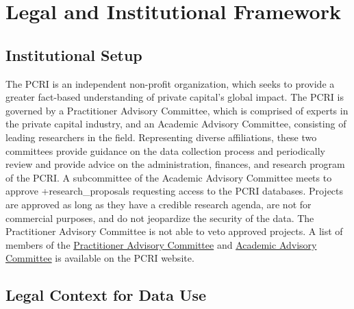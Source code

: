 \documentclass[
]{book}
\begin{document}
\hypertarget{legal-and-institutional-framework-3}{%
\section{Legal and Institutional Framework}\label{legal-and-institutional-framework-3}}

\hypertarget{institutional-setup-3}{%
\subsection{Institutional Setup}\label{institutional-setup-3}}

The PCRI is an independent non-profit organization, which seeks to provide a greater fact-based understanding of private capital's global impact. The PCRI is governed by a Practitioner Advisory Committee, which is comprised of experts in the private capital industry, and an Academic Advisory Committee, consisting of leading researchers in the field. Representing diverse affiliations, these two committees provide guidance on the data collection process and periodically review and provide advice on the administration, finances, and research program of the PCRI. A subcommittee of the Academic Advisory Committee meets to approve +research\_proposals\textbar{} requesting access to the PCRI databases. Projects are approved as long as they have a credible research agenda, are not for commercial purposes, and do not jeopardize the security of the data. The Practitioner Advisory Committee is not able to veto approved projects. A list of members of the \href{http://privatecapitalresearchinstitute.org/advisory-committee.php}{Practitioner Advisory Committee} and \href{http://www.privatecapitalresearchinstitute.org/academic-advisory-board.php}{Academic Advisory Committee} is available on the PCRI website.

\hypertarget{legal-context-for-data-use-3}{%
\subsection{Legal Context for Data Use}\label{legal-context-for-data-use-3}}
\end{document}
